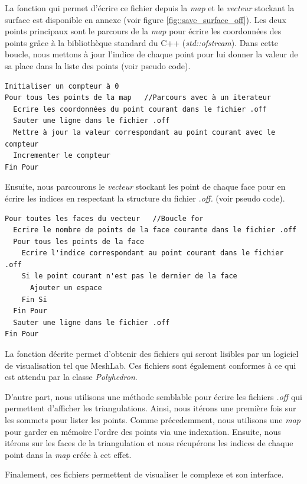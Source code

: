 La fonction qui permet d'écrire ce fichier depuis la \textit{map} et le \textit{vecteur}
stockant la surface est disponible en annexe (voir figure \ref{fig::save_surface_off}).
Les deux points principaux sont le parcours de la \textit{map} pour écrire les coordonnées
des points grâce à la bibliothèque standard du C++ (\textit{std::ofstream}).
Dans cette boucle, nous mettons à jour l'indice
de chaque point pour lui donner la valeur de sa place dans la liste des points (voir
pseudo code).


\begin{lstlisting}
Initialiser un compteur à 0
Pour tous les points de la map   //Parcours avec à un iterateur
  Ecrire les coordonnées du point courant dans le fichier .off
  Sauter une ligne dans le fichier .off
  Mettre à jour la valeur correspondant au point courant avec le compteur
  Incrementer le compteur
Fin Pour
\end{lstlisting}


Ensuite, nous parcourons le \textit{vecteur} stockant les point de chaque face pour en écrire
les indices en respectant la structure du fichier \textit{.off.} (voir pseudo code).

\begin{lstlisting}
Pour toutes les faces du vecteur   //Boucle for
  Ecrire le nombre de points de la face courante dans le fichier .off
  Pour tous les points de la face
    Ecrire l'indice correspondant au point courant dans le fichier .off
    Si le point courant n'est pas le dernier de la face
      Ajouter un espace
    Fin Si
  Fin Pour
  Sauter une ligne dans le fichier .off
Fin Pour
\end{lstlisting}

La fonction décrite permet d'obtenir des fichiers qui seront lisibles par un logiciel de
visualisation tel que MeshLab. Ces fichiers sont également conformes à ce qui est
attendu par la classe \textit{Polyhedron}.

D'autre part, nous utilisons une méthode semblable pour écrire les fichiers \textit{.off}
qui permettent d'afficher les triangulations. Ainsi, nous itérons une première fois
sur les sommets pour lister les points. Comme précedemment, nous utilisons une \textit{map}
pour garder en mémoire l'ordre des points via une indexation. Ensuite, nous itérons sur
les faces de la triangulation et nous récupérons les indices de chaque point dans la
\textit{map} créée à cet effet.


Finalement, ces fichiers permettent de visualiser le complexe et son interface.

